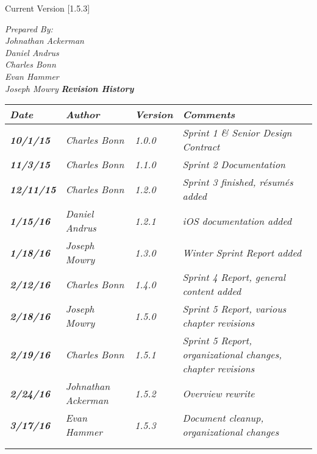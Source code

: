 


Current Version [1.5.3]
\vspace*{5mm}

{\color{SDColor5}
\noindent
\textit{Prepared By:}\\
\textit{Johnathan Ackerman}\\
\textit{Daniel Andrus}\\
\textit{Charles Bonn}\\
\textit{Evan Hammer}\\
\textit{Joseph Mowry}
}
\vfill
\noindent
{\color{SDColor3} \textit{\textbf{Revision History}}}\\
\begin{tabular}{|>{\raggedright}p{1.5cm}|>{\raggedright}p{3cm}|>{\raggedright}p{1.5cm}|>{\raggedright}p{9cm}|}
\hline
\textit{\textbf{Date}} &  \textit{\textbf{Author}} & \textit{\textbf{Version}} & \textit{\textbf{Comments}}\tabularnewline
\hline
 \textit{\textbf{10/1/15}} & \textit{Charles Bonn} & \textit{1.0.0} & \textit{Sprint 1 \& Senior Design Contract}\tabularnewline
 \hline
  \textit{\textbf{11/3/15}} & \textit{Charles Bonn} & \textit{1.1.0} & \textit{Sprint 2 Documentation}\tabularnewline
 \hline
 \textit{\textbf{12/11/15}} & \textit{Charles Bonn} & \textit{1.2.0} & \textit{Sprint 3 finished, résumés added}\tabularnewline
\hline
 \textit{\textbf{1/15/16}} & \textit{Daniel Andrus} & \textit{1.2.1} & \textit{iOS documentation added}\tabularnewline
\hline
 \textit{\textbf{1/18/16}} & \textit{Joseph Mowry} & \textit{1.3.0} & \textit{Winter Sprint Report added}\tabularnewline
\hline
 \textit{\textbf{2/12/16}} & \textit{Charles Bonn} & \textit{1.4.0} & \textit{Sprint 4 Report, general content added}\tabularnewline
\hline
 \textit{\textbf{2/18/16}} & \textit{Joseph Mowry} & \textit{1.5.0} & \textit{Sprint 5 Report, various chapter revisions}\tabularnewline
\hline
 \textit{\textbf{2/19/16}} & \textit{Charles Bonn} & \textit{1.5.1} & \textit{Sprint 5 Report, organizational changes, chapter revisions}\tabularnewline
\hline
 \textit{\textbf{2/24/16}} & \textit{Johnathan Ackerman} & \textit{1.5.2} & \textit{Overview rewrite}\tabularnewline
\hline
 \textit{\textbf{3/17/16}} & \textit{Evan Hammer} & \textit{1.5.3} & \textit{Document cleanup, organizational changes}\tabularnewline
\hline
\textit{\textbf{}} & \textit{} & \textit{} & \textit{}\tabularnewline
 &  &  & \tabularnewline
\hline
\end{tabular}
\vfill

